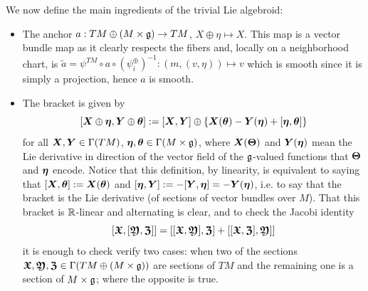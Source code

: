 We now define the main ingredients of the trivial Lie algebroid:
    \begin{itemize}
    \item The anchor $a: TM \oplus (M \times \mathfrak{g}) \to TM$, $X \oplus \eta \mapsto X$. This map is a vector bundle map as it clearly respects the fibers and, locally on a neighborhood chart, is $\tilde a = \psi^{TM} \circ a \circ (\psi^{\oplus}_i)^{-1}: (m, (v, \eta)) \mapsto v$ which is smooth since it is simply a projection, hence $a$ is smooth.
    
    \item The bracket is given by 
    \[
        [\bm{X} \oplus \bm{\eta}, \bm{Y} \oplus \bm{\theta}] := [\bm{X}, \bm{Y}] \oplus \{\bm{X}(\bm{\theta}) - \bm{Y}(\bm{\eta}) + [\bm{\eta}, \bm{\theta}]\}
    \]
    for all $\bm{X}, \bm{Y} \in \Gamma(TM)$, $\bm{\eta}, \bm{\theta} \in \Gamma(M \times \mathfrak{g})$, where $\bm{X}(\bm{\Theta})$ and $\bm{Y}(\bm{\eta})$ mean the Lie derivative in direction of the vector field of the $\mathfrak{g}$-valued functions that $\bm{\Theta}$ and $\bm{\eta}$ encode. %
    Notice that this definition, by linearity, is equivalent to saying that $[\bm{X}, \bm{\theta}] := \bm{X}(\bm{\theta})$ and $[\bm{\eta}, \bm{Y}] := - [\bm{Y}, \bm{\eta}] = -\bm{Y}(\bm{\eta})$, i.e. to say that the bracket is the Lie derivative (of sections of vector bundles over $M$). %
    That this bracket is $\mathbb{R}$-linear and alternating is clear, and to check the Jacobi identity
    \[ [\bm{\mathfrak{X}}, [\bm{\mathfrak{Y}}, \bm{\mathfrak{Z}}]] = [[\bm{\mathfrak{X}}, \bm{\mathfrak{Y}}], \bm{\mathfrak{Z}}] + [[\bm{\mathfrak{X}}, \bm{\mathfrak{Z}}], \bm{\mathfrak{Y}}]] \] it is enough to check verify two cases: when two of the sections $\bm{\mathfrak{X}}, \bm{\mathfrak{Y}}, \bm{\mathfrak{Z}} \in \Gamma(TM \oplus (M \times \mathfrak{g}))$ are sections of $TM$ and the remaining one is a section of $M \times \mathfrak{g}$; where the opposite is true.
    \end{itemize}

